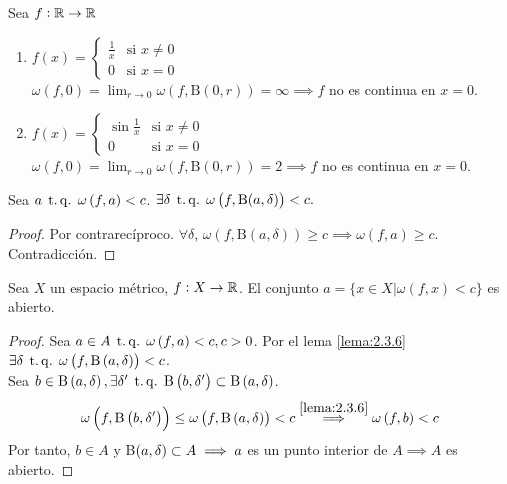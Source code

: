 \begin{example*}
    Sea $f: \mathbb{R} \to \mathbb{R}$
    \begin{enumerate}
        \item $f(x) = \begin{cases}
            \frac{1}{x} & \text{si } x \neq 0 \\
            0 & \text{si } x = 0
            \end{cases}$ \\
            $\omega \left( f, 0 \right) = \lim_{r \to 0} \omega \left( f, \text{B} \left( 0, r \right) \right) = \infty \implies f$ no es continua en $x = 0$.
        \item $f(x) = \begin{cases}
            \sin \frac{1}{x} & \text{si } x \neq 0 \\
            0 & \text{si } x = 0
            \end{cases}$ \\
            $\omega \left( f, 0 \right) = \lim_{r \to 0} \omega \left( f, \text{B} \left( 0, r \right) \right) = 2 \implies f$ no es continua en $x = 0$.
    \end{enumerate}
\end{example*}
\begin{lema} \label{lema:2.3.6}
    Sea $a \operatorname{\;t.q.\;} \omega \left( f, a \right) < c$. $\exists \delta \operatorname{\;t.q.\;} \omega \left( f, \text{B}(a, \delta) \right) < c.$
\end{lema}
\begin{proof}
    Por contrarecíproco. $\forall \delta$, $\omega \left( f, \text{B} \left( a, \delta \right) \right) \geq c \implies \omega \left( f, a \right) \geq c$. Contradicción.
\end{proof}
\begin{prop}
    Sea $X$ un espacio métrico, $f : X \to \mathbb{R}$. El conjunto $a = \{ x \in X | \omega \left( f, x \right) < c \}$ es abierto.
\end{prop}
\begin{proof}
    Sea $a \in A \operatorname{\;t.q.\;} \omega \left( f, a \right) < c, c > 0$. Por el lema \ref{lema:2.3.6} $\exists \delta \operatorname{\;t.q.\;} \omega \left( f, \text{B} \left( a, \delta \right) \right) < c$. \\
    Sea $b \in \text{B} \left( a, \delta \right), \exists \delta' \operatorname{\;t.q.\;} \text{B} \left( b, \delta' \right) \subset \text{B} \left( a, \delta \right)$.
    \[
    \omega \left( f, \text{B} \left( b, \delta' \right) \right) \leq \omega \left( f, \text{B} \left( a, \delta \right) \right) < c \stackrel{\ref{lema:2.3.6}}{\implies} \omega \left( f, b \right) < c
    \]
    Por tanto, $b \in A$ y B$\left( a, \delta \right) \subset A \implies a$ es un punto interior de $A \implies A$ es abierto.
\end{proof}
